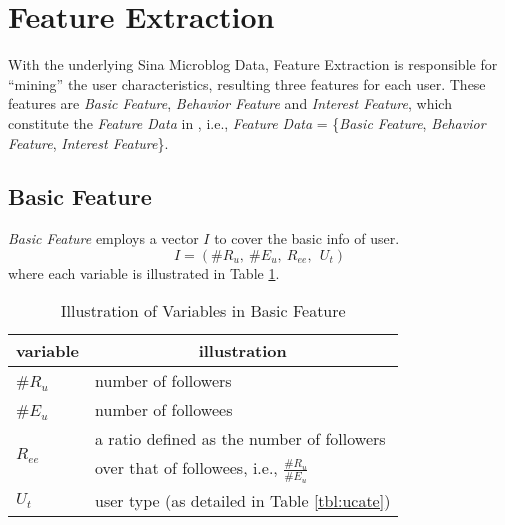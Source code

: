

\section{Feature Extraction}
\label{sec:fe}

With the underlying Sina Microblog Data, Feature Extraction is responsible for ``mining'' the user characteristics, resulting three features for each user.
These features are \textit{Basic Feature}, \textit{Behavior Feature} and \textit{Interest Feature}, which constitute the \textit{Feature Data} in \sys{}, i.e., \textit{Feature Data} = \{\textit{Basic Feature}, \textit{Behavior Feature}, \textit{Interest Feature}\}.

\subsection{Basic Feature}

\textit{Basic Feature} employs a vector $I$ to cover the basic info of user.
\begin{equation}
\label{eq:info}
	I = (\#R_u,\ \#E_u,\ R_{ee},\ \ U_t)
\end{equation}
where each variable is illustrated in Table \ref{tbl:fe-info}.

\begin{table}[!htb]
\centering
\begin{small}
\caption{Illustration of Variables in Basic Feature}
\vspace{0.3cm}
\label{tbl:fe-info}
\begin{tabular}{ll}
\toprule
\multicolumn{1}{c}{\textbf{variable}} & \multicolumn{1}{c}{\textbf{illustration}}	\\	\midrule \midrule
\#$R_u$				& number of followers				\\	\midrule
\#$E_u$				& number of followees				\\	\midrule
\multirow{4}{*}{$R_{ee}$} & \multirow{2}{*}{a ratio defined as the number of followers} \\
                   &                     \\
                   & \multirow{2}{*}{over that of followees, i.e., $\frac{\#R_u}{\#E_u}$} \\
                   & 						\\	\midrule
$U_t$					& user type (as detailed in Table \ref{tbl:ucate})			\\ \bottomrule
\end{tabular}
\end{small}
\end{table}


